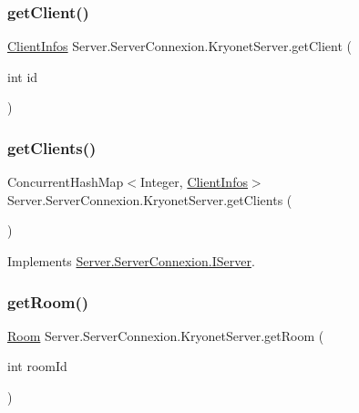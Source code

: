 \subsubsection{\texorpdfstring{get\+Client()}{getClient()}}
{\footnotesize\ttfamily \mbox{\hyperlink{classServer_1_1ServerConnexion_1_1ClientInfos}{Client\+Infos}} Server.\+Server\+Connexion.\+Kryonet\+Server.\+get\+Client (\begin{DoxyParamCaption}\item[{int}]{id }\end{DoxyParamCaption})\hspace{0.3cm}{\ttfamily [inline]}}

\mbox{\label{classServer_1_1ServerConnexion_1_1KryonetServer_a49d513edab305edc72d56d173dd44ad3}} 
\subsubsection{\texorpdfstring{get\+Clients()}{getClients()}}
{\footnotesize\ttfamily Concurrent\+Hash\+Map$<$Integer, \mbox{\hyperlink{classServer_1_1ServerConnexion_1_1ClientInfos}{Client\+Infos}}$>$ Server.\+Server\+Connexion.\+Kryonet\+Server.\+get\+Clients (\begin{DoxyParamCaption}{ }\end{DoxyParamCaption})\hspace{0.3cm}{\ttfamily [inline]}}



Implements \mbox{\hyperlink{interfaceServer_1_1ServerConnexion_1_1IServer_a0b71f139e86b01657d54b4be165d0c8d}{Server.\+Server\+Connexion.\+I\+Server}}.

\mbox{\label{classServer_1_1ServerConnexion_1_1KryonetServer_a4f294be7cbfd6a2c94191d3c488a9a12}} 
\subsubsection{\texorpdfstring{get\+Room()}{getRoom()}}
{\footnotesize\ttfamily \mbox{\hyperlink{classServer_1_1ServerConnexion_1_1Room}{Room}} Server.\+Server\+Connexion.\+Kryonet\+Server.\+get\+Room (\begin{DoxyParamCaption}\item[{int}]{room\+Id }\end{DoxyParamCaption})\hspace{0.3cm}{\ttfamily [inline]}}

